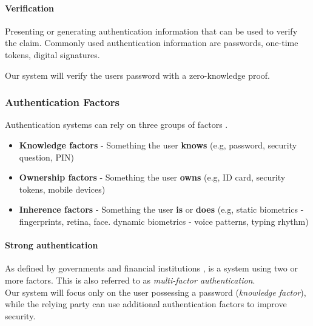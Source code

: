 
\paragraph{Verification} Presenting or generating authentication information that can be used to verify the claim.
Commonly used authentication information are passwords, one-time tokens, digital signatures.

Our system will verify the users password with a zero-knowledge proof.

\subsubsection{Authentication Factors}

Authentication systems can rely on three groups of factors \cite{council2005authentication}.

\begin{itemize}
	\item \textbf{Knowledge factors} - Something the user \textbf{knows} (e.g, password, security question, PIN)
	\item \textbf{Ownership factors} - Something the user \textbf{owns} (e.g, ID card, security tokens, mobile devices)
	\item \textbf{Inherence factors} - Something the user \textbf{is} or \textbf{does} (e.g, static biometrics - fingerprints, retina, face. dynamic biometrics - voice patterns, typing rhythm)
\end{itemize}

\paragraph{Strong authentication} As defined by governments and financial institutions \cite{schaeffer2010national, ecb2013recommendations}, is a system using two or more factors.
This is also referred to as \textit{multi-factor authentication}.\\
\newline
Our system will focus only on the user possessing a password (\textit{knowledge factor}), while the relying party can use additional authentication factors to improve security.

\newpage